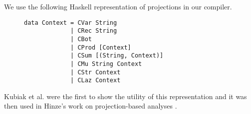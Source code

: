 We use the following Haskell representation of projections in our compiler.

\begin{figure}
\centering
\begin{BVerbatim}
data Context = CVar String
             | CRec String
             | CBot
             | CProd [Context]
             | CSum [(String, Context)]
             | CMu String Context
             | CStr Context
             | CLaz Context
\end{BVerbatim}
\end{figure}


Kubiak et al. were the first to show the utility of this representation and it
was then used in Hinze's work on projection-based analyses \cite{kubiak,
hinze1995projection}.
